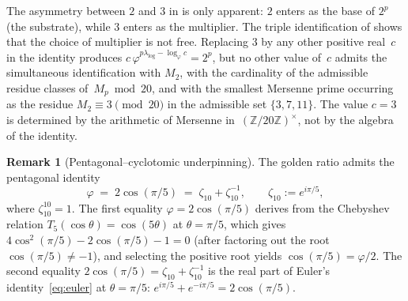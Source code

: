 \documentclass[11pt]{amsart}
\theoremstyle{definition}
\newtheorem{Remark}[Theorem]{Remark}
\newcommand{\golden}{\varphi}
\newcommand{\Mp}{M_{p}}
\newcommand{\Ztwenty}{(\mathbb{Z}/20\mathbb{Z})^{\times}}
\begin{document}
The asymmetry between $2$ and $3$ in  is only
apparent: $2$ enters as the base of $2^{p}$ (the substrate), while $3$
enters as the multiplier.  The triple identification of
 shows that the choice of multiplier is not free.
Replacing $3$ by any other positive real~$c$ in the identity produces
$c\,\golden^{p\lambda_{\log}-\log_{\golden}c}=2^{p}$, but no other value
of~$c$ admits the simultaneous identification with $M_{2}$, with the
cardinality of the admissible residue classes of~$\Mp\bmod 20$, and with
the smallest Mersenne prime occurring as the residue
$M_{2}\equiv 3\pmod{20}$ in the admissible set $\{3,7,11\}$.  The value
$c=3$ is determined by the arithmetic of Mersenne in~$\Ztwenty$, not by
the algebra of the identity.

\begin{Remark}[Pentagonal--cyclotomic underpinning]\label{rem:pentagon}
The golden ratio admits the pentagonal identity
\begin{equation}\label{eq:pentagon}
  \golden \;=\; 2\cos(\pi/5) \;=\; \zeta_{10}+\zeta_{10}^{-1},
  \qquad \zeta_{10} := e^{i\pi/5},
\end{equation}
where $\zeta_{10}^{10}=1$.  The first equality
$\golden=2\cos(\pi/5)$ derives from the Chebyshev relation
$T_{5}(\cos\theta)=\cos(5\theta)$ at $\theta=\pi/5$, which gives
$4\cos^{2}(\pi/5)-2\cos(\pi/5)-1=0$ (after factoring out the root
$\cos(\pi/5)\neq -1$), and selecting the positive root yields
$\cos(\pi/5)=\golden/2$.  The second equality
$2\cos(\pi/5)=\zeta_{10}+\zeta_{10}^{-1}$ is the real part of Euler's
identity~\eqref{eq:euler} at $\theta=\pi/5$:
$e^{i\pi/5}+e^{-i\pi/5}=2\cos(\pi/5)$.


\end{Remark}
\end{document}
